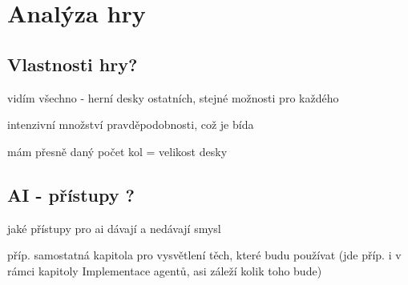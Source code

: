 \chapter{Analýza hry}

\section{Vlastnosti hry?}
vidím všechno - herní desky ostatních, stejné možnosti pro každého

intenzivní množství pravděpodobnosti, což je bída

mám přesně daný počet kol = velikost desky


\section{AI - přístupy ?}
jaké přístupy pro ai dávají a nedávají smysl

příp. samostatná kapitola pro vysvětlení těch, které budu používat (jde příp. i v rámci kapitoly Implementace agentů, asi záleží kolik toho bude)

